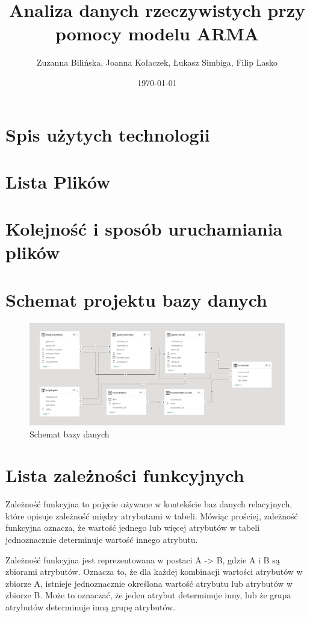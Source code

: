 \documentclass{article}
\title{Analiza danych rzeczywistych przy pomocy modelu ARMA}
\author{Zuzanna Bilińska, Joanna Kołaczek, Łukasz Simbiga, Filip Lasko}
\date{\today}
\theoremstyle{break}
\begin{document}
	\maketitle
	\tableofcontents
	\clearpage

\section{Spis użytych technologii}

\section{Lista Plików}

\section{Kolejność i sposób uruchamiania plików}

\section{Schemat projektu bazy danych}
\begin{figure}[H]
	\begin{center}
		\includegraphics[scale=0.25]{schemat.png}
		\caption{Schemat bazy danych}
		\label{fig:schemat}
	\end{center}
\end{figure}

\section{Lista zależności funkcyjnych}
Zależność funkcyjna to pojęcie używane w kontekście baz danych relacyjnych, które opisuje zależność między atrybutami w tabeli. Mówiąc prościej, zależność funkcyjna oznacza, że wartość jednego lub więcej atrybutów w tabeli jednoznacznie determinuje wartość innego atrybutu.

Zależność funkcyjna jest reprezentowana w postaci A -> B, gdzie A i B są zbiorami atrybutów. Oznacza to, że dla każdej kombinacji wartości atrybutów w zbiorze A, istnieje jednoznacznie określona wartość atrybutu lub atrybutów w zbiorze B. Może to oznaczać, że jeden atrybut determinuje inny, lub że grupa atrybutów determinuje inną grupę atrybutów.
\end{document}
